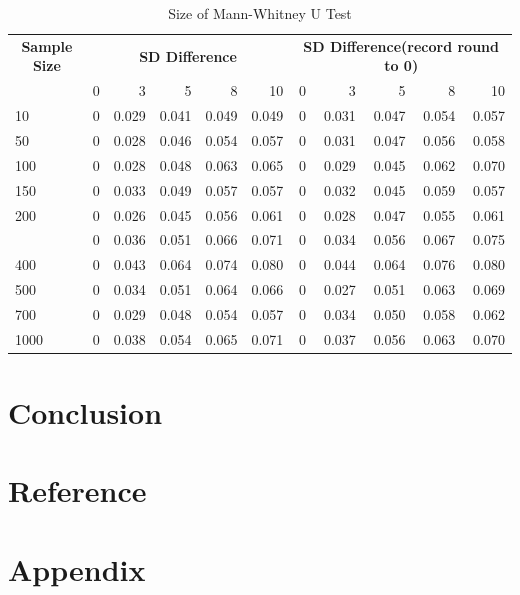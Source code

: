 \documentclass[]{article}
\begin{document}
\begin{table}

\caption{\label{tab:size-tables}Size of Mann-Whitney U Test}
\centering
\begin{tabular}[t]{lrrrrrrrrrr}
\toprule
\multicolumn{1}{c}{\bfseries Sample Size} & \multicolumn{5}{c}{\bfseries SD Difference} & \multicolumn{5}{c}{\bfseries SD Difference(record round to 0)} \\
\cmidrule(l{2pt}r{2pt}){1-1} \cmidrule(l{2pt}r{2pt}){2-6} \cmidrule(l{2pt}r{2pt}){7-11}
  & 0 & 3 & 5 & 8 & 10 & 0 & 3 & 5 & 8 & 10\\
\midrule
10 & 0 & 0.029 & 0.041 & 0.049 & 0.049 & 0 & 0.031 & 0.047 & 0.054 & 0.057\\
50 & 0 & 0.028 & 0.046 & 0.054 & 0.057 & 0 & 0.031 & 0.047 & 0.056 & 0.058\\
100 & 0 & 0.028 & 0.048 & 0.063 & 0.065 & 0 & 0.029 & 0.045 & 0.062 & 0.070\\
150 & 0 & 0.033 & 0.049 & 0.057 & 0.057 & 0 & 0.032 & 0.045 & 0.059 & 0.057\\
200 & 0 & 0.026 & 0.045 & 0.056 & 0.061 & 0 & 0.028 & 0.047 & 0.055 & 0.061\\
\addlinespace
300 & 0 & 0.036 & 0.051 & 0.066 & 0.071 & 0 & 0.034 & 0.056 & 0.067 & 0.075\\
400 & 0 & 0.043 & 0.064 & 0.074 & 0.080 & 0 & 0.044 & 0.064 & 0.076 & 0.080\\
500 & 0 & 0.034 & 0.051 & 0.064 & 0.066 & 0 & 0.027 & 0.051 & 0.063 & 0.069\\
700 & 0 & 0.029 & 0.048 & 0.054 & 0.057 & 0 & 0.034 & 0.050 & 0.058 & 0.062\\
1000 & 0 & 0.038 & 0.054 & 0.065 & 0.071 & 0 & 0.037 & 0.056 & 0.063 & 0.070\\
\bottomrule
\end{tabular}
\end{table}

\hypertarget{conclusion}{%
\section{Conclusion}\label{conclusion}}

\hypertarget{reference}{%
\section{Reference}\label{reference}}

\hypertarget{appendix}{%
\section*{Appendix}\label{appendix}}
\end{document}
